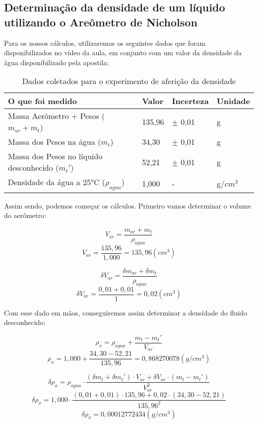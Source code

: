 \subsection{Determinação da densidade de um líquido utilizando o
Areômetro de Nicholson}

Para os nossos cálculos, utilizaremos os seguintes dados que foram disponibilizados no vídeo da aula, em conjunto com um valor da densidade da água disponibilizado pela apostila:

\begin{table}[H]
    \centering
    \begin{tabular}{ |M{5cm}||M{2cm}||M{2cm}||M{2cm}|  }
        \hline
        \textbf{O que foi medido} & \textbf{Valor} & \textbf{Incerteza} & \textbf{Unidade}\\
        \hline
        Massa Aerômetro + Pesos ($m_{ar} + m_t$)         & 135,96    & $\pm$ 0,01 & g\\
        Massa dos Pesos na água ($m_t$)                     & 34,30     & $\pm$ 0,01 & g\\
        Massa dos Pesos no líquido desconhecido ($m_t'$)    & 52,21     & $\pm$ 0,01 & g\\
        \hline
        Densidade da água a 25°C ($\rho _{agua}$)           & 1,000 & - & g/$cm^3$\\
        \hline
    \end{tabular}
    \caption{Dados coletados para o experimento de aferição da densidade}
\end{table}

Assim sendo, podemos começar os cálculos. Primeiro vamos determinar o volume do aerômetro:

\[ V_{ar} = \frac{m_{ar} + m_t}{\rho _{agua}} \]
\[ V_{ar} = \frac{135,96}{1,000} = 135,96 (cm^3) \]

\[ \delta V_{ar} = \frac{\delta m_{ar} + \delta m_t}{\rho _{agua}} \]
\[ \delta V_{ar} = \frac{0,01 + 0,01}{1} = 0,02 (cm^3) \]

Com esse dado em mãos, conseguiremos assim determinar a densidade do fluido desconhecido:

\[ \rho _x = \rho _{agua} + \frac{m_t - m_t'}{V_{ar}} \]
\[ \rho _x = 1,000 + \frac{34,30 - 52,21}{135,96} = 0,868270078 (g/cm^3) \]

\[ \delta \rho _x = \rho _{agua} \cdot \frac{(\delta m_t + \delta m_t') \cdot V_{ar} + \delta V_{ar} \cdot (m_t - m_t')}{V_{ar}^2} \]
\[ \delta \rho _x = 1,000 \cdot \frac{(0,01 + 0,01) \cdot 135,96 + 0,02 \cdot (34,30 - 52,21)}{135,96^2} \]
\[ \delta \rho _x = 0,00012772434 (g/cm^3) \]


